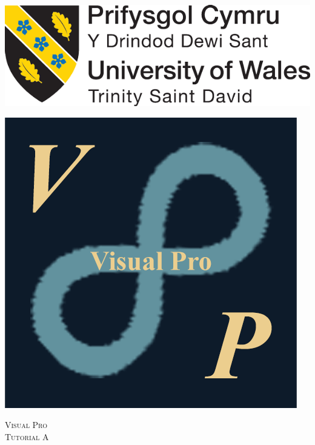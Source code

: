 \documentclass[10pt]{article}
\begin{document}
\begin{center}																		%
\newcommand{\HRule}{\rule{\linewidth}{0.5mm}}									%
\begin{minipage}{0.48\textwidth} \begin{flushleft}
\includegraphics[scale = 0.15]{Figures/Logo/UWTSD-Logo}
\end{flushleft}\end{minipage}
\begin{minipage}{0.48\textwidth} \begin{flushright}
\includegraphics[scale = 0.4]{Figures/Logo/VP-Logo-Large}
\end{flushright}\end{minipage}

\vspace*{-1.5cm}								%
\textsc{\huge Visual Pro\\ \vspace{5px} Tutorial A}\\[1.5cm]	


\end{center}
\end{document}
